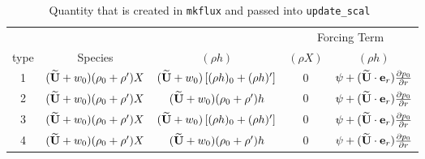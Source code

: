\begin{table*}
\begin{center}
\caption{Quantity that is created in {\tt mkflux} and passed into {\tt update\_scal}\newline\
}
\begin{tabular}{c|c|c|c|c}
       &            &              &\multicolumn{2}{c}{Forcing Term} \\
{type} & {Species } & {$(\rho h)$} & {$(\rho X)$} & {$(\rho h)$} \\
\hline 
1 & $(\widetilde{{\bf U}}+w_0)(\rho_0+\rho^\prime) X          $ & $(\widetilde{{\bf U}}+w_0)\left [(\rho h)_0 + (\rho h)^\prime\right]$ & 0 & $ \psi + (\widetilde{{\bf U}} \cdot \mathbf{e}_r) \frac{\partial p_0}{\partial r} $ \\[2mm]
2 & $(\widetilde{{\bf U}}+w_0)(\rho_0+\rho^\prime) X          $ & $(\widetilde{{\bf U}}+w_0) (\rho_0+\rho^\prime) h$ & 0 & $ \psi + (\widetilde{{\bf U}} \cdot \mathbf{e}_r) \frac{\partial p_0}{\partial r} $ \\[2mm]
3 & $(\widetilde{{\bf U}}+w_0)(\rho_0+\rho^\prime) X          $ & $(\widetilde{{\bf U}}+w_0)\left [(\rho h)_0 + (\rho h)^\prime\right]$ & 0 & $ \psi + (\widetilde{{\bf U}} \cdot \mathbf{e}_r) \frac{\partial p_0}{\partial r}$ \\[2mm]
4 & $(\widetilde{{\bf U}}+w_0)(\rho_0+\rho^\prime) X          $ & $(\widetilde{{\bf U}}+w_0) (\rho_0+\rho^\prime) h$ & 0 & $ \psi + (\widetilde{{\bf U}} \cdot \mathbf{e}_r) \frac{\partial p_0}{\partial r} $ \\[2mm]
\hline
\end{tabular}
\end{center}
\end{table*}

